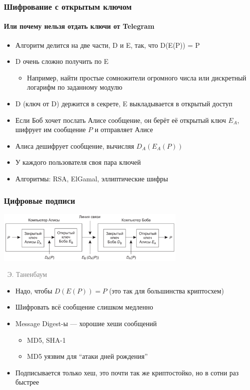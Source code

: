 \documentclass[xetex,mathserif,serif]{beamer}
\newcommand{\attribution}[1] {
\vspace{-5mm}\begin{flushright}\begin{scriptsize}\textcolor{gray}{\textcopyright\, #1}\end{scriptsize}\end{flushright}
}
\begin{document}
	\begin{frame}
		\frametitle{Шифрование с открытым ключом}
		\framesubtitle{Или почему нельзя отдать ключи от Telegram}
		\begin{itemize}
			\item Алгоритм делится на две части, D и E, так, что D(E(P)) = P
			\item D очень сложно получить по E
			\begin{itemize}
				\item Например, найти простые сомножители огромного числа или дискретный логарифм по заданному модулю
			\end{itemize}
			\item D (ключ от D) держится в секрете, E выкладывается в открытый доступ
			\item Если Боб хочет послать Алисе сообщение, он берёт её открытый ключ $E_A$, шифрует им сообщение $P$ и отправляет Алисе
			\item Алиса дешифрует сообщение, вычисляя $D_A(E_A(P))$
			\item У каждого пользователя своя пара ключей
			\item Алгоритмы: RSA, ElGamal, эллиптические шифры
		\end{itemize}
	\end{frame}

	\begin{frame}
		\frametitle{Цифровые подписи}
		\begin{center}
			\includegraphics[width=0.7\textwidth]{signature.png}
			\attribution{Э. Таненбаум}
		\end{center}
		\begin{itemize}
			\item Надо, чтобы $D(E(P)) = P$ (это так для большинства криптосхем)
			\item Шифровать всё сообщение слишком медленно
			\item Message Digest-ы --- хорошие хеши сообщений
			\begin{itemize}
				\item MD5, SHA-1
				\item MD5 уязвим для ``атаки дней рождения''
			\end{itemize}
			\item Подписывается только хеш, это почти так же криптостойко, но в сотни раз быстрее
		\end{itemize}
	\end{frame}
\end{document}
